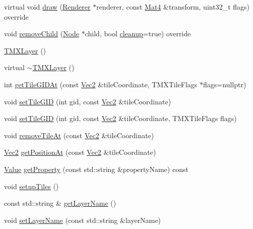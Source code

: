\begin{DoxyCompactItemize}
\item 
virtual void \hyperlink{classexperimental_1_1TMXLayer_aa41866228db8e8b84321d0b6e3f8f112}{draw} (\hyperlink{classRenderer}{Renderer} $\ast$renderer, const \hyperlink{classMat4}{Mat4} \&transform, uint32\+\_\+t flags) override
\item 
void \hyperlink{classexperimental_1_1TMXLayer_ade60657de43636151aef237010b2965b}{remove\+Child} (\hyperlink{classNode}{Node} $\ast$child, bool \hyperlink{classNode_aa2de84c6cdeec9cd647d236c30ee0567}{cleanup}=true) override
\item 
\hyperlink{classexperimental_1_1TMXLayer_a2f5fa01f1f9d2755cab5fe7944a845f5}{T\+M\+X\+Layer} ()
\item 
virtual \hyperlink{classexperimental_1_1TMXLayer_ad62def3144c78954dc875abeaf306453}{$\sim$\+T\+M\+X\+Layer} ()
\item 
int \hyperlink{classexperimental_1_1TMXLayer_a945cd3f3f69a23be9123150ab6411bd8}{get\+Tile\+G\+I\+D\+At} (const \hyperlink{classVec2}{Vec2} \&tile\+Coordinate, T\+M\+X\+Tile\+Flags $\ast$flags=nullptr)
\item 
void \hyperlink{classexperimental_1_1TMXLayer_a2e5305f3c43f671bdd66689e1e093a62}{set\+Tile\+G\+ID} (int gid, const \hyperlink{classVec2}{Vec2} \&tile\+Coordinate)
\item 
void \hyperlink{classexperimental_1_1TMXLayer_abebb182793c45ce5980abe6cc012bf9c}{set\+Tile\+G\+ID} (int gid, const \hyperlink{classVec2}{Vec2} \&tile\+Coordinate, T\+M\+X\+Tile\+Flags flags)
\item 
void \hyperlink{classexperimental_1_1TMXLayer_a949df39d466a6de9bdfc4abe3cb62651}{remove\+Tile\+At} (const \hyperlink{classVec2}{Vec2} \&tile\+Coordinate)
\item 
\hyperlink{classVec2}{Vec2} \hyperlink{classexperimental_1_1TMXLayer_a9e0fda71c9aa1b09a6715cdc9f3f5f63}{get\+Position\+At} (const \hyperlink{classVec2}{Vec2} \&tile\+Coordinate)
\item 
\hyperlink{classValue}{Value} \hyperlink{classexperimental_1_1TMXLayer_a1400878c7f3ac3c4a2b59e56e5c9cc0a}{get\+Property} (const std\+::string \&property\+Name) const
\item 
void \hyperlink{classexperimental_1_1TMXLayer_a494819a39befaa6f802af34d0bb89af3}{setup\+Tiles} ()
\item 
const std\+::string \& \hyperlink{classexperimental_1_1TMXLayer_ae990c2f9653649658ae009cd6b75c8d8}{get\+Layer\+Name} ()
\item 
void \hyperlink{classexperimental_1_1TMXLayer_a4b2bc396c567d19dc300d582cfb0440d}{set\+Layer\+Name} (const std\+::string \&layer\+Name)

\end{DoxyCompactItemize}
